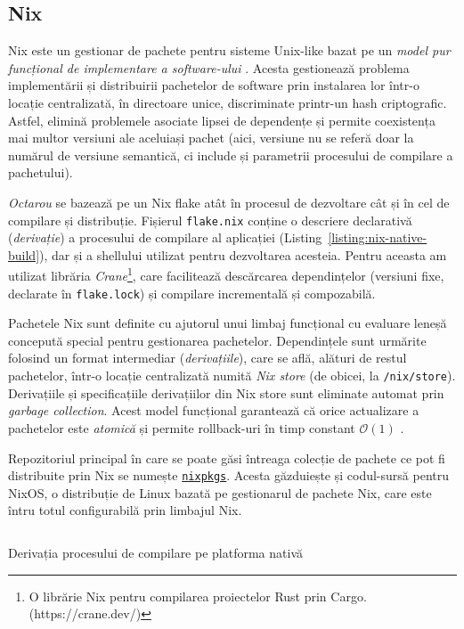 \documentclass[a4paper]{article}
\begin{document}
\subsection{Nix}
Nix este un gestionar de pachete pentru sisteme Unix-like bazat pe un \textit{model pur funcțional de implementare a software-ului} \cite{edolstra}.
Acesta gestionează problema implementării și distribuirii pachetelor de software prin instalarea lor într-o locație centralizată, în directoare
unice, discriminate printr-un hash criptografic. Astfel, elimină problemele asociate lipsei de dependențe și permite coexistența mai multor
versiuni ale aceluiași pachet (aici, versiune nu se referă doar la numărul de versiune semantică, ci include și parametrii procesului de compilare
a pachetului).

\textit{Octarou} se bazează pe un Nix flake atât în procesul de dezvoltare cât și în cel de compilare și distribuție. Fișierul \texttt{flake.nix} conține
o descriere declarativă (\textit{derivație}) a procesului de compilare al aplicației (Listing~\ref{listing:nix-native-build}), dar și a shellului utilizat
pentru dezvoltarea acesteia. Pentru aceasta am
utilizat librăria \textit{Crane}\footnote{O librărie Nix pentru compilarea proiectelor Rust prin Cargo. (https://crane.dev/)}, care facilitează
descărcarea dependințelor (versiuni fixe, declarate în \texttt{flake.lock}) și compilare incrementală și compozabilă.

Pachetele Nix sunt definite cu ajutorul unui limbaj funcțional cu evaluare leneșă concepută special pentru gestionarea pachetelor. Dependințele
sunt urmărite folosind un format intermediar (\textit{derivațiile}), care se află, alături de restul pachetelor, într-o locație centralizată numită
\textit{Nix store} (de obicei, la \texttt{/nix/store}). Derivațiile și specificațiile derivațiilor din Nix store sunt eliminate automat prin
\textit{garbage collection}. Acest model funcțional garantează că orice actualizare a pachetelor este \textit{atomică} și permite rollback-uri
în timp constant $\mathcal{O}(1)$ \cite{edolstra}.

Repozitoriul principal în care se poate găsi întreaga colecție de pachete ce pot fi distribuite prin Nix se numește \href{https://github.com/nixos/nixpkgs}{\texttt{nixpkgs}}.
Acesta găzduiește și codul-sursă pentru NixOS, o distribuție de Linux bazată pe gestionarul de pachete Nix, care este întru totul configurabilă prin
limbajul Nix.

\begin{listing}
	\inputminted{nix}{codeblocks/package.nix}
	\caption{Derivația procesului de compilare pe platforma nativă}
	\label{listing:nix-native-build}
\end{listing}
\end{document}

